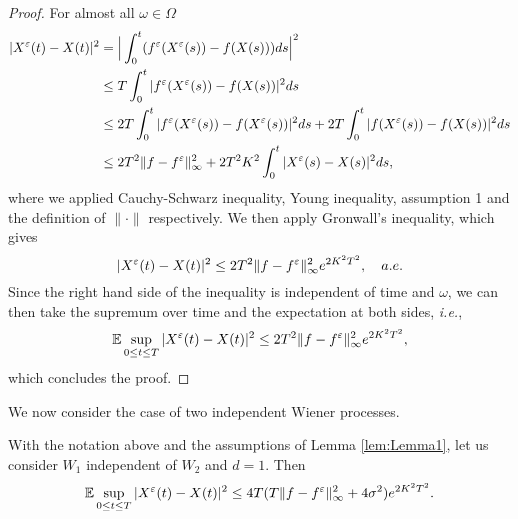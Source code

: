 \begin{proof}
For almost all $\omega \in \Omega$ 
\begin{equation*}
\begin{aligned}
	|X^\varepsilon(t) - X(t)|^2  &= \Big|\int_0^t (f^\varepsilon (X^\varepsilon(s)) - f(X(s)))ds \Big|^2 \\
	&\leq T \int_0^t |f^\varepsilon (X^\varepsilon(s)) - f(X(s))|^2 ds  \\
	&\leq 2T \int_0^t |f^\varepsilon (X^\varepsilon(s)) - f(X^\varepsilon(s))|^2 ds + 2T \int_0^t |f (X^\varepsilon(s)) - f(X(s))|^2 ds \\
	&\leq 2T^2 \|f - f^\varepsilon\|_{\infty}^2 + 2T^2K^2 \int_0^t |X^\varepsilon(s) - X(s)|^2ds,
\end{aligned} 
\end{equation*}
where we applied Cauchy-Schwarz inequality, Young inequality, assumption 1 and the definition of $\|\cdot \|$ respectively. We then apply Gronwall's inequality, which gives 
\begin{equation}\label{eq:TheoryEpsilon}
	|X^\varepsilon(t) - X(t)|^2 \leq  2T^2 \|f - f^\varepsilon\|_{\infty}^2 e^{2K^2T^2}, \quad a.e.
\end{equation}
Since the right hand side of the inequality is independent of time and $\omega$, we can then take the supremum over time and the expectation at both sides, \textit{i.e.},
\begin{equation*}
	\mathbb{E} \sup_{0 \leq t \leq T} |X^\varepsilon(t) - X(t)|^2 \leq  2T^2 \|f - f^\varepsilon\|_{\infty}^2 e^{2K^2T^2},
\end{equation*}
which concludes the proof.
\end{proof}
\noindent We now consider the case of two independent Wiener processes.

\begin{lemma}\label{lem:Lemma2} With the notation above and the assumptions of Lemma \ref{lem:Lemma1}, let us consider $W_1$ independent of $W_2$ and $d = 1$. Then
\begin{equation*}	
	\mathbb{E} \sup_{0 \leq t \leq T} |X^\varepsilon(t) - X(t)|^2 \leq 4T(T \|f - f^\varepsilon\|_{\infty}^2 + 4\sigma^2) e^{2K^2T^2}.
\end{equation*}
\end{lemma}

